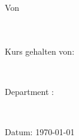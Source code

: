 

\begin{titlepage}
\begin{center}
    \vspace*{-5,7cm}
    \hspace*{-1,43cm}
    
    \vspace{2.3cm}
    

    \vspace{1cm}
    {\textbf{\Titel\\}}
    \vspace{2.4cm}
    
    {} \\
    \vspace{0.5cm}
    {}\\
    \vspace{0.5cm}
    Von\\
    \SchuelerName \\ \SchuelerPKZ\\
    \vspace{0.9cm}
    {\begin{singlespace}Kurs gehalten von:\\\end{singlespace}}
    {\begin{singlespace}\Lehrer\\\end{singlespace}}


\end{center}
{\raggedleft\vfill{\begin{singlespace}
     Department \Department :\\
\end{singlespace}
 \Studiengang\\
 \begin{singlespace}
 Datum: \today\\
 
 
 \end{singlespace}
}\par
}
\end{titlepage}
